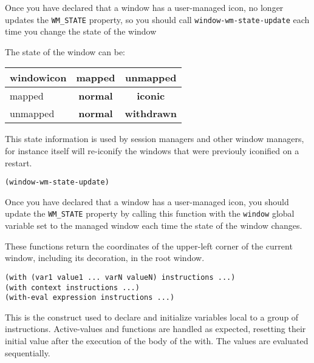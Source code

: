 Once you have declared that a window has a user-managed icon, {\GWM} no
longer updates the \verb"WM_STATE" property, so you should call
\verb"window-wm-state-update" each time you change the state of the window

The state of the window can be:

\begin{tabular}{|l|c|c|}
\hline
\vbox{\hbox{window}\hbox{icon}} & mapped & unmapped \\
\hline
mapped & {\bf normal} & {\bf iconic} \\
\hline
unmapped & {\bf normal} & {\bf withdrawn} \\
\hline
\end{tabular}

This state information is used by session managers and other window
managers, for instance {\GWM} itself will re-iconify the windows that were
previouly iconified on a restart.


{\usagefont\begin{verbatim}
(window-wm-state-update)
\end{verbatim}}\usageupspace

Once you have declared that a window has a user-managed icon, you should
update the \verb"WM_STATE" property by calling this function with the
\verb"window" global variable set to the managed window each time the state
of the window changes.

        

These functions return the coordinates of the upper-left corner of the
current window, including its decoration, in the root window. 

        
{\usagefont\begin{verbatim}
(with (var1 value1 ... varN valueN) instructions ...)
(with context instructions ...)
(with-eval expression instructions ...)
\end{verbatim}}\usageupspace

This is the construct used to declare and initialize variables local to a
group of instructions. Active-values and functions are handled as expected,
resetting their initial value after the execution of the body of the with.
The values are evaluated sequentially.

